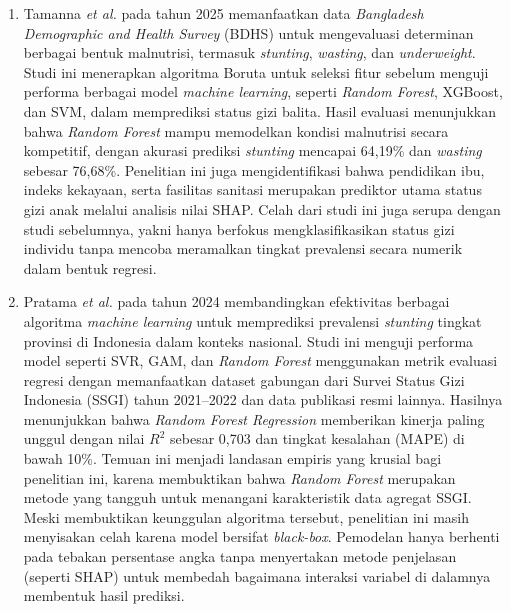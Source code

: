 \begin{enumerate}
    \item Tamanna \textit{et al.} \cite{tamanna2025identifying} pada tahun 2025 memanfaatkan data \textit{Bangladesh Demographic and Health Survey} (BDHS) untuk mengevaluasi determinan berbagai bentuk malnutrisi, termasuk \textit{stunting}, \textit{wasting}, dan \textit{underweight}. Studi ini menerapkan algoritma Boruta untuk seleksi fitur sebelum menguji performa berbagai model \textit{machine learning}, seperti \textit{Random Forest}, XGBoost, dan SVM, dalam memprediksi status gizi balita. Hasil evaluasi menunjukkan bahwa \textit{Random Forest} mampu memodelkan kondisi malnutrisi secara kompetitif, dengan akurasi prediksi \textit{stunting} mencapai 64,19\% dan \textit{wasting} sebesar 76,68\%. Penelitian ini juga mengidentifikasi bahwa pendidikan ibu, indeks kekayaan, serta fasilitas sanitasi merupakan prediktor utama status gizi anak melalui analisis nilai SHAP. Celah dari studi ini juga serupa dengan studi sebelumnya, yakni hanya berfokus mengklasifikasikan status gizi individu tanpa mencoba meramalkan tingkat prevalensi secara numerik dalam bentuk regresi.

    \item Pratama \textit{et al.} \cite{pratama2024comparison} pada tahun 2024 membandingkan efektivitas berbagai algoritma \textit{machine learning} untuk memprediksi prevalensi \textit{stunting} tingkat provinsi di Indonesia dalam konteks nasional. Studi ini menguji performa model seperti SVR, GAM, dan \textit{Random Forest} menggunakan metrik evaluasi regresi dengan memanfaatkan dataset gabungan dari Survei Status Gizi Indonesia (SSGI) tahun 2021--2022 dan data publikasi resmi lainnya. Hasilnya menunjukkan bahwa \textit{Random Forest Regression} memberikan kinerja paling unggul dengan nilai $R^2$ sebesar 0,703 dan tingkat kesalahan (MAPE) di bawah 10\%. Temuan ini menjadi landasan empiris yang krusial bagi penelitian ini, karena membuktikan bahwa \textit{Random Forest} merupakan metode yang tangguh untuk menangani karakteristik data agregat SSGI. Meski membuktikan keunggulan algoritma tersebut, penelitian ini masih menyisakan celah karena model bersifat \textit{black-box}. Pemodelan hanya berhenti pada tebakan persentase angka tanpa menyertakan metode penjelasan (seperti SHAP) untuk membedah bagaimana interaksi variabel di dalamnya membentuk hasil prediksi.
\end{enumerate}


